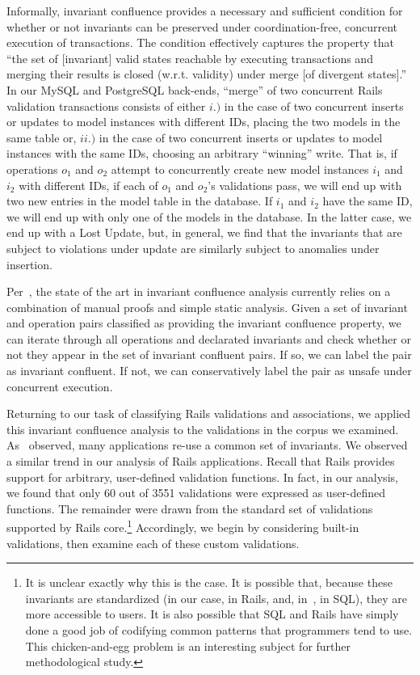 Informally, invariant confluence provides a necessary and sufficient
condition for whether or not invariants can be preserved under
coordination-free, concurrent execution of transactions. The condition
effectively captures the property that ``the set of [invariant] valid
states reachable by executing transactions and merging their results
is closed (w.r.t. validity) under merge [of divergent states].'' In
our MySQL and PostgreSQL back-ends, ``merge'' of two concurrent Rails
validation transactions consists of either $i.)$ in the case of two
concurrent inserts or updates to model instances with different IDs,
placing the two models in the same table or, $ii.)$ in the case of two
concurrent inserts or updates to model instances with the same IDs,
choosing an arbitrary ``winning'' write. That is, if operations $o_1$
and $o_2$ attempt to concurrently create new model instances $i_1$ and
$i_2$ with different IDs, if each of $o_1$ and $o_2$'s validations
pass, we will end up with two new entries in the model table in the
database. If $i_1$ and $i_2$ have the same ID, we will end up with
only one of the models in the database. In the latter case, we end up
with a Lost Update, but, in general, we find that the invariants that
are subject to violations under update are similarly subject to
anomalies under insertion.

Per~\cite{coord-avoid}, the state of the art in invariant confluence
analysis currently relies on a combination of manual proofs and simple
static analysis. Given a set of invariant and operation pairs
classified as providing the invariant confluence property, we can
iterate through all operations and declarated invariants and check
whether or not they appear in the set of invariant confluent pairs. If
so, we can label the pair as invariant confluent. If not, we can
conservatively label the pair as unsafe under concurrent execution.

Returning to our task of classifying Rails validations and
associations, we applied this invariant confluence analysis to the
validations in the corpus we examined. As~\cite{coord-avoid} observed,
many applications re-use a common set of invariants. We observed a
similar trend in our analysis of Rails applications. Recall that Rails
provides support for arbitrary, user-defined validation functions. In
fact, in our analysis, we found that only 60 out of 3551 validations
were expressed as user-defined functions. The remainder were drawn
from the standard set of validations supported by Rails
core.\footnote{It is unclear exactly why this is the case. It is
  possible that, because these invariants are standardized (in our
  case, in Rails, and, in~\cite{coord-avoid}, in SQL), they are more
  accessible to users. It is also possible that SQL and Rails have
  simply done a good job of codifying common patterns that programmers
  tend to use. This chicken-and-egg problem is an interesting subject
  for further methodological study.} Accordingly, we begin by
considering built-in validations, then examine each of these custom
validations.

